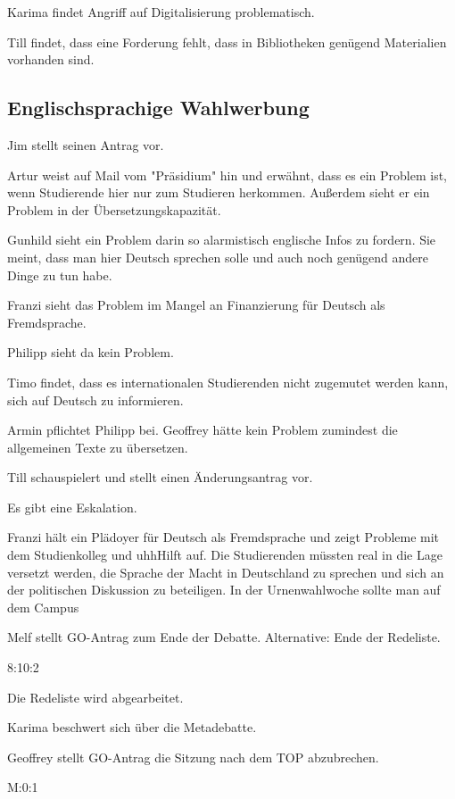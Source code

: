 \documentclass[ngerman,headheight=70pt]{scrartcl}
\begin{document}
    Karima findet Angriff auf Digitalisierung problematisch.

    Till findet, dass eine Forderung fehlt, dass in Bibliotheken genügend
    Materialien vorhanden sind.

    \subsection{Englischsprachige Wahlwerbung}

    Jim stellt seinen Antrag vor.

    Artur weist auf Mail vom "Präsidium" hin und erwähnt, dass es ein Problem
    ist, wenn Studierende hier nur zum Studieren herkommen. Außerdem sieht
    er ein Problem in der Übersetzungskapazität.

    Gunhild sieht ein Problem darin so alarmistisch englische Infos zu fordern.
    Sie meint, dass man hier Deutsch sprechen solle und auch noch genügend andere
    Dinge zu tun habe.

    Franzi sieht das Problem im Mangel an Finanzierung für Deutsch als Fremdsprache.

    Philipp sieht da kein Problem.

    Timo findet, dass es internationalen Studierenden nicht zugemutet werden kann,
    sich auf Deutsch zu informieren.

    Armin pflichtet Philipp bei. Geoffrey hätte kein Problem zumindest die
    allgemeinen Texte zu übersetzen.

    Till schauspielert und stellt einen Änderungsantrag vor.

    Es gibt eine Eskalation.

    Franzi hält ein Plädoyer für Deutsch als Fremdsprache und zeigt Probleme
    mit dem Studienkolleg und uhhHilft auf. Die Studierenden müssten real in
    die Lage versetzt werden, die Sprache der Macht in Deutschland zu sprechen
    und sich an der politischen Diskussion zu beteiligen.
    In der Urnenwahlwoche sollte man auf dem Campus

    Melf stellt GO-Antrag zum Ende der Debatte. Alternative: Ende der Redeliste.

    8:10:2

    Die Redeliste wird abgearbeitet.

    Karima beschwert sich über die Metadebatte.

    Geoffrey stellt GO-Antrag die Sitzung nach dem TOP abzubrechen.

    M:0:1
\end{document}
